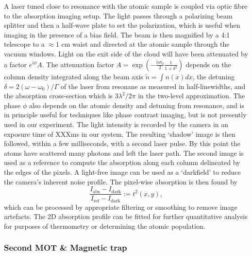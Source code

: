 A laser tuned close to resonance with the atomic sample is coupled via optic fibre to the absorption imaging setup. The light passes through a polarizing beam splitter and then a half-wave plate to set the polarization, which is useful when imaging in the presence of a bias field. The beam is then magnified by a 4:1 telescope to a $\approx1$ cm waist and directed at the atomic sample through the vacuum windows. Light on the exit side of the cloud will have been attenuated by a factor $e^{i\phi}A$.  The attenuation factor $A=\exp(-\frac{\tilde{n}\sigma_0}{2}\frac{1}{1+\delta^2})$ depends on the column density integrated along the beam axis $\tilde{n} = \int n(x) dx$, the detuning $\delta=2(\omega-\omega_0)/\Gamma$ of the laser from resonane as measured in half-linewidths, and the absorption cross-section which is $3\lambda^2/2\pi$ in the two-level approximation. The phase $\phi$ also depends on the atomic density and detuning from resonance, and is in principle useful for techniques like phase contrast imaging, but is not presently used in our experiment. The light intensity is recorded by the camera in an exposure time of XXXms in our system. The resulting `shadow' image is then followed, within a few milliseconds, with a second laser pulse. By this point the atoms have scattered many photons and left the laser path. The second image is used as a reference to compute the absorption along each column delineated by the edges of the pixels. A light-free image can be used as a `darkfield' to reduce the camera's inherent noise profile. The pixel-wise absorption is then found by
\begin{equation}
	\frac{I_\textrm{abs}-I_\textrm{dark}}{I_\textrm{ref}-I_\textrm{dark}}:=t^2(x,y),
\end{equation}
which can be processed by appropriate filtering or smoothing to remove image artefacts. The 2D absorption profile can be fitted for further quantitative analysis for purposes of thermometry or determining the atomic population.

\subsubsection{Second MOT \& Magnetic trap}
